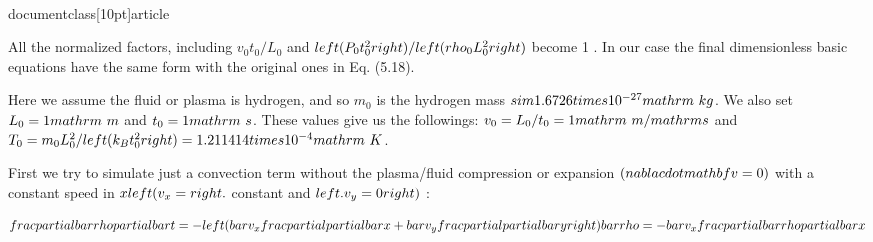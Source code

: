 \\documentclass[10pt]{article}
\begin{document}
All the normalized factors, including $v_{0} t_{0} / L_{0}$ and $\\left(P_{0} t_{0}^{2}\\right) /\\left(\\rho_{0} L_{0}^{2}\\right)$ become 1 . In our case the final dimensionless basic equations have the same form with the original ones in Eq. (5.18).

Here we assume the fluid or plasma is hydrogen, and so $m_{0}$ is the hydrogen mass $\\sim 1.6726 \\times 10^{-27} \\mathrm{~kg}$. We also set $L_{0}=1 \\mathrm{~m}$ and $t_{0}=1 \\mathrm{~s}$. These values give us the followings: $v_{0}=L_{0} / t_{0}=1 \\mathrm{~m} / \\mathrm{s}$ and $T_{0}=m_{0} L_{0}^{2} /\\left(k_{B} t_{0}^{2}\\right)=1.211414 \\times 10^{-4} \\mathrm{~K}$.

First we try to simulate just a convection term without the plasma/fluid compression or expansion $(\\nabla \\cdot \\mathbf{v}=0)$ with a constant speed in $x\\left(v_{x}=\\right.$ constant and $\\left.v_{y}=0\\right)$ :

$$
\\frac{\\partial \\bar{\\rho}}{\\partial \\bar{t}}=-\\left(\\bar{v}_{x} \\frac{\\partial}{\\partial \\bar{x}}+\\bar{v}_{y} \\frac{\\partial}{\\partial \\bar{y}}\\right) \\bar{\\rho}=-\\bar{v}_{x} \\frac{\\partial \\bar{\\rho}}{\\partial \\bar{x}}
$$
\end{document}
